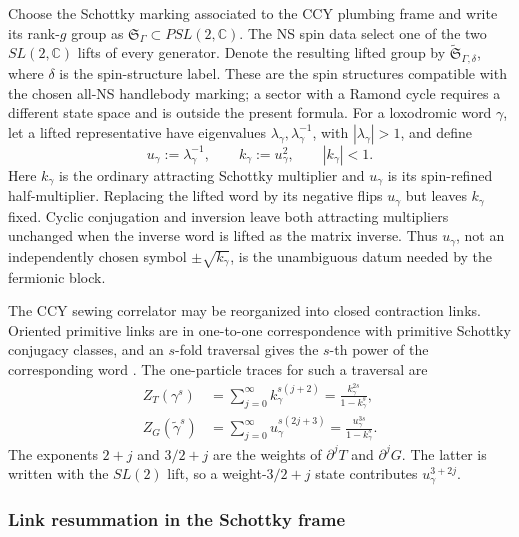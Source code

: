 \documentclass[11pt]{article}
\begin{document}
Choose the Schottky marking associated to the CCY plumbing frame and write
its rank-\(g\) group as
\(\mathfrak S_\Gamma\subset PSL(2,\mathbb C)\).  The NS spin data select one
of the two \(SL(2,\mathbb C)\) lifts of every generator.  Denote the resulting
lifted group by \(\widetilde{\mathfrak S}_{\Gamma,\delta}\), where \(\delta\)
is the spin-structure label.  These are the spin structures compatible with
the chosen all-NS handlebody marking; a sector with a Ramond cycle requires a
different state space and is outside the present formula.  For a loxodromic
word \(\gamma\), let a lifted
representative have eigenvalues
\(\lambda_\gamma,\lambda_\gamma^{-1}\), with
\(|\lambda_\gamma|>1\), and define
\begin{equation}
 u_\gamma:=\lambda_\gamma^{-1},
 \qquad
 k_\gamma:=u_\gamma^2,
 \qquad |k_\gamma|<1.
 \label{eq:lifted-half-multiplier}
\end{equation}
Here \(k_\gamma\) is the ordinary attracting Schottky multiplier and
\(u_\gamma\) is its spin-refined half-multiplier.  Replacing the lifted word
by its negative flips \(u_\gamma\) but leaves \(k_\gamma\) fixed.  Cyclic
conjugation and inversion leave both attracting multipliers unchanged when
the inverse word is lifted as the matrix inverse.  Thus \(u_\gamma\), not an
independently chosen symbol \(\pm\sqrt{k_\gamma}\), is the unambiguous datum
needed by the fermionic block.

The CCY sewing correlator may be reorganized into closed contraction links.
Oriented primitive links are in one-to-one correspondence with primitive
Schottky conjugacy classes, and an \(s\)-fold traversal gives the \(s\)-th
power of the corresponding word
\cite{ChenWu2015OneLoop}.  The one-particle traces for such a traversal are
\begin{align}
 Z_T(\gamma^s)
 &=\sum_{j=0}^{\infty}k_\gamma^{s(j+2)}
   =\frac{k_\gamma^{2s}}{1-k_\gamma^s},
 \label{eq:stress-link-trace}\\
 Z_G(\widetilde\gamma^s)
 &=\sum_{j=0}^{\infty}u_\gamma^{s(2j+3)}
   =\frac{u_\gamma^{3s}}{1-k_\gamma^s}.
 \label{eq:supercurrent-link-trace}
\end{align}
The exponents \(2+j\) and \(3/2+j\) are the weights of
\(\partial^jT\) and \(\partial^jG\).  The latter is written with the
\(SL(2)\) lift, so a weight-\(3/2+j\) state contributes
\(u_\gamma^{3+2j}\).

\subsubsection{Link resummation in the Schottky frame}
\end{document}
